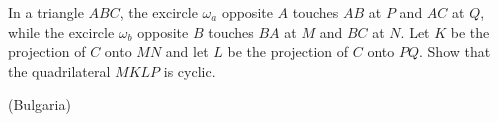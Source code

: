 In a triangle $ABC$,  the excircle $\omega_a$ opposite $A$ touches $AB$ at $P$ and $AC$ at $Q$,  while the excircle $\omega_b$ opposite $B$ touches $BA$ at $M$ and $BC$ at $N$. Let $K$ be the projection of $C$ onto $MN$ and let $L$ be the projection of $C$ onto $PQ$. Show that the quadrilateral $MKLP$ is cyclic.

(Bulgaria)